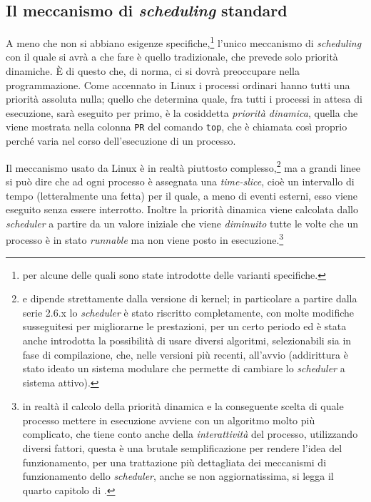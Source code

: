 \subsection{Il meccanismo di \textit{scheduling} standard}
\label{sec:proc_sched_stand}

A meno che non si abbiano esigenze specifiche,\footnote{per alcune delle quali
  sono state introdotte delle varianti specifiche.} l'unico meccanismo di
\textit{scheduling} con il quale si avrà a che fare è quello tradizionale, che
prevede solo priorità dinamiche. È di questo che, di norma, ci si dovrà
preoccupare nella programmazione.  Come accennato in Linux i processi ordinari
hanno tutti una priorità assoluta nulla; quello che determina quale, fra tutti
i processi in attesa di esecuzione, sarà eseguito per primo, è la cosiddetta
\textsl{priorità dinamica}, quella che viene mostrata nella colonna
\texttt{PR} del comando \texttt{top}, che è chiamata così proprio perché varia
nel corso dell'esecuzione di un processo.

Il meccanismo usato da Linux è in realtà piuttosto complesso,\footnote{e
  dipende strettamente dalla versione di kernel; in particolare a partire
  dalla serie 2.6.x lo \textit{scheduler} è stato riscritto completamente, con
  molte modifiche susseguitesi per migliorarne le prestazioni, per un certo
  periodo ed è stata anche introdotta la possibilità di usare diversi
  algoritmi, selezionabili sia in fase di compilazione, che, nelle versioni
  più recenti, all'avvio (addirittura è stato ideato un sistema modulare che
  permette di cambiare lo \textit{scheduler} a sistema attivo).} ma a grandi
linee si può dire che ad ogni processo è assegnata una \textit{time-slice},
cioè un intervallo di tempo (letteralmente una fetta) per il quale, a meno di
eventi esterni, esso viene eseguito senza essere interrotto.  Inoltre la
priorità dinamica viene calcolata dallo \textit{scheduler} a partire da un
valore iniziale che viene \textsl{diminuito} tutte le volte che un processo è
in stato \textit{runnable} ma non viene posto in esecuzione.\footnote{in
  realtà il calcolo della priorità dinamica e la conseguente scelta di quale
  processo mettere in esecuzione avviene con un algoritmo molto più
  complicato, che tiene conto anche della \textsl{interattività} del processo,
  utilizzando diversi fattori, questa è una brutale semplificazione per
  rendere l'idea del funzionamento, per una trattazione più dettagliata dei
  meccanismi di funzionamento dello \textit{scheduler}, anche se non
  aggiornatissima, si legga il quarto capitolo di \cite{LinKernDev}.}

